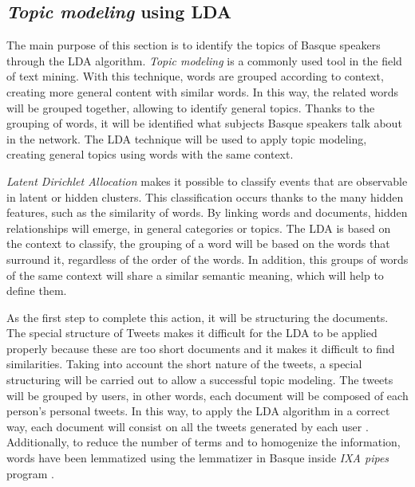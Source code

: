 \documentclass[information,article,submit,moreauthors,pdftex,10pt,a4paper]{Definitions/mdpi}
\begin{document}
\subsection{\textit{Topic modeling} using LDA}
\label{sec:datu analisi}

The main purpose of this section is to identify the topics of Basque speakers through the LDA algorithm. \textit{Topic modeling} is a commonly used tool in the field of text mining. With this technique, words are grouped according to context, creating more general content with similar words. In this way, the related words will be grouped together, allowing to identify general topics. Thanks to the grouping of words, it will be identified what subjects Basque speakers talk about in the network. The LDA technique will be used to apply topic modeling, creating general topics using words with the same context.

\textit{Latent Dirichlet Allocation} \citep{blei2003latent} makes it possible to classify events that are observable in latent or hidden clusters. This classification occurs thanks to the many hidden features, such as the similarity of words. By linking words and documents, hidden relationships will emerge, in general categories or topics. The LDA is based on the context to classify, the grouping of a word will be based on the words that surround it, regardless of the order of the words. In addition, this groups of words of the same context will share a similar semantic meaning, which will help to define them.

As the first step to complete this action, it will be structuring the documents. The special structure of Tweets makes it difficult for the LDA to be applied properly because these are too short documents and it makes it difficult to find similarities. Taking into account the short nature of the tweets, a special structuring will be carried out to allow a successful topic modeling. The tweets will be grouped by users, in other words, each document will be composed of each person's personal tweets. In this way, to apply the LDA algorithm in a correct way, each document will consist on all the tweets generated by each user \citep{hong2010empirical, zhao2011comparing}. Additionally, to reduce the number of terms and to homogenize the information, words have been lemmatized using the lemmatizer in Basque inside \textit{IXA pipes} program \citep{agerri2014ixa}. 
\end{document}

